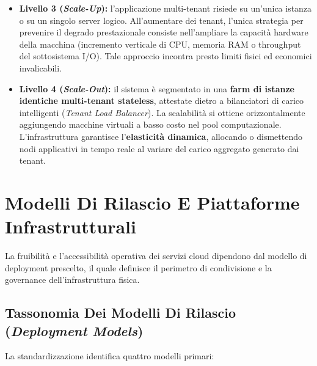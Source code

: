 \documentclass[11pt, a4paper]{article}
\begin{document}
\begin{itemize}
    \item \textbf{Livello 3 (\emph{Scale-Up}):} l'applicazione multi-tenant risiede su un'unica istanza o su un singolo server logico. All'aumentare dei tenant, l'unica strategia per prevenire il degrado prestazionale consiste nell'ampliare la capacità hardware della macchina (incremento verticale di CPU, memoria RAM o throughput del sottosistema I/O). Tale approccio incontra presto limiti fisici ed economici invalicabili.
    \item \textbf{Livello 4 (\emph{Scale-Out}):} il sistema è segmentato in una \textbf{farm di istanze identiche multi-tenant stateless}, attestate dietro a bilanciatori di carico intelligenti (\emph{Tenant Load Balancer}). La scalabilità si ottiene orizzontalmente aggiungendo macchine virtuali a basso costo nel pool computazionale. L'infrastruttura garantisce l'\textbf{elasticità dinamica}, allocando o dismettendo nodi applicativi in tempo reale al variare del carico aggregato generato dai tenant.
\end{itemize}

\newpage

\section{Modelli Di Rilascio E Piattaforme Infrastrutturali}

La fruibilità e l'accessibilità operativa dei servizi cloud dipendono dal modello di deployment prescelto, il quale definisce il perimetro di condivisione e la governance dell'infrastruttura fisica.

\subsection{Tassonomia Dei Modelli Di Rilascio (\emph{Deployment Models})}

La standardizzazione identifica quattro modelli primari:
\end{document}
